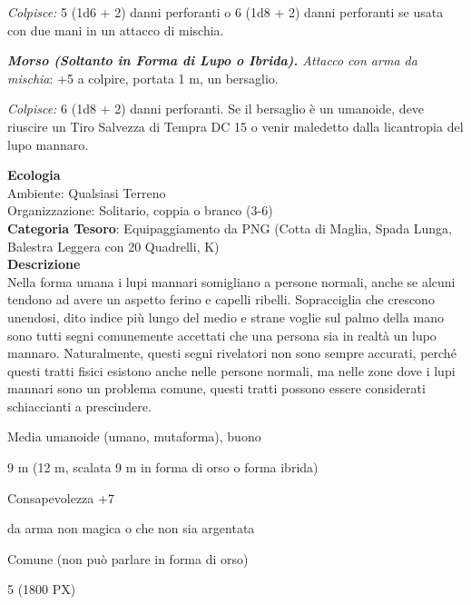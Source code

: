 \begin{multicols}{2}
{\emph{Colpisce:} 5 (1d6 + 2) danni perforanti o 6 (1d8 + 2) danni perforanti se usata con due mani in un attacco di mischia.

\emph{\textbf{Morso (Soltanto in Forma di Lupo o Ibrida).} Attacco con arma da mischia}: +5 a colpire, portata 1 m, un bersaglio.

\emph{Colpisce:} 6 (1d8 + 2) danni perforanti. Se il bersaglio è un umanoide, deve riuscire un Tiro Salvezza di Tempra DC 15 o venir maledetto dalla licantropia del lupo mannaro.

\textbf{Ecologia}\\
Ambiente: Qualsiasi Terreno\\
Organizzazione: Solitario, coppia o branco (3-6)\\
\textbf{Categoria Tesoro}: Equipaggiamento da PNG (Cotta di Maglia, Spada Lunga, Balestra Leggera con 20 Quadrelli, K)\\
\textbf{Descrizione}\\
Nella forma umana i lupi mannari somigliano a persone normali, anche se alcuni tendono ad avere un aspetto ferino e capelli ribelli. Sopracciglia che crescono unendosi, dito indice più lungo del medio e strane voglie sul palmo della mano sono tutti segni comunemente accettati che una persona sia in realtà un lupo mannaro. Naturalmente, questi segni rivelatori non sono sempre accurati, perché questi tratti fisici esistono anche nelle persone normali, ma nelle zone dove i lupi mannari sono un problema comune, questi tratti possono essere considerati schiaccianti a prescindere.

\begin{description}[noitemsep, topsep=0pt, parsep=0pt, partopsep=0pt, itemsep=1pt, leftmargin=2.35cm,  labelwidth=2.2cm, itemindent=0cm, listparindent=0pt] %
\setlength{\baselineskip}{10pt}
\item[\textbf{Taglia/Tipo}] Media umanoide (umano, mutaforma), buono
\item[\textbf{Caratt.}] 
\item[\textbf{Punti Ferita}] 
\item[\textbf{Movimento}] 9 m (12 m, scalata 9 m in forma di orso o forma ibrida)
\item[\textbf{Tiri Salvez.}] 
\item[\textbf{Comp.}] Consapevolezza +7
\item[\textbf{Imm. Danni}] da arma non magica o che non sia argentata
\item[\textbf{Linguaggi}] Comune (non può parlare in forma di orso)
\item[\textbf{Sfida}] 5 (1800 PX)
\end{description}
\smallskip

}
\end{multicols}
